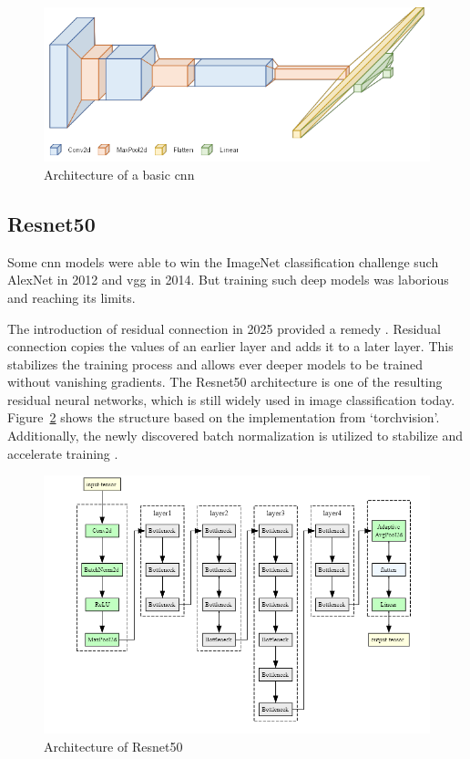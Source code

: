 \begin{figure}[H]
    \begin{center}
    \includegraphics[width=15cm]{../images/cnn_architecture.png}
    \caption{Architecture of a basic \gls{cnn}}\label{fig:cnn_architecture}
    \end{center}
\end{figure}

\subsection{Resnet50}
Some \gls{cnn} models were able to win the ImageNet classification challenge such AlexNet \autocite{krizhevsky2012} in 2012 and \gls{vgg} \autocite{simonyan2015} in 2014. But training such deep models was laborious and reaching its limits. 

The introduction of residual connection in 2025 provided a remedy \autocite{he2015}. Residual connection copies the values of an earlier layer and adds it to a later layer. This stabilizes the training process and allows ever deeper models to be trained without vanishing gradients.
The Resnet50 architecture is one of the resulting residual neural networks, which is still widely used in image classification today. Figure~\ref{fig:resnet50_architecture} shows the structure based on the implementation from `torchvision'. Additionally, the newly discovered batch normalization is utilized to stabilize and accelerate training \autocite{ioffe2015}.

\begin{figure}[H]
    \begin{center}
    \includegraphics[width=15cm]{../images/resnet50_architecture.png}
    \caption{Architecture of Resnet50}\label{fig:resnet50_architecture}
    \end{center}
\end{figure}

